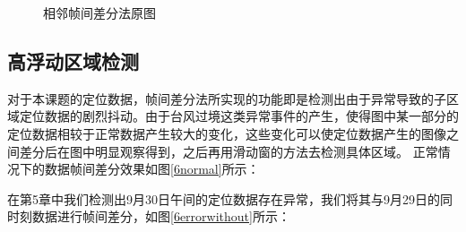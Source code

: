 \documentclass[a4paper,AutoFakeBold,oneside,12pt]{book}
\begin{document}
\begin{figure}[!htbp]
    \centering
    \quad %
   \caption{相邻帧间差分法原图} %
    \label{Fig:didi} %


\end{figure}


\subsection{高浮动区域检测}
	对于本课题的定位数据，帧间差分法所实现的功能即是检测出由于异常导致的子区域定位数据的剧烈抖动。由于台风过境这类异常事件的产生，使得图中某一部分的定位数据相较于正常数据产生较大的变化，这些变化可以使定位数据产生的图像之间差分后在图中明显观察得到，之后再用滑动窗的方法去检测具体区域。
	正常情况下的数据帧间差分效果如图\ref{6normal}所示：


	在第5章中我们检测出9月30日午间的定位数据存在异常，我们将其与9月29日的同时刻数据进行帧间差分，如图\ref{6errorwithout}所示：

\end{document}
